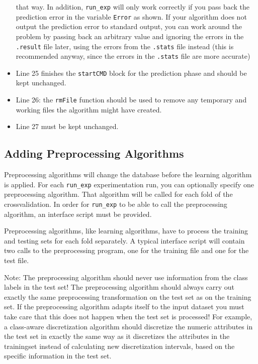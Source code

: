 \documentclass[a4paper,10pt,twoside]{article}
\begin{document}
\begin{itemize}
that way. In addition, \texttt{run\_exp} will only work correctly
if you pass back the prediction error in the variable \texttt{Error}
as shown. If your algorithm does not output the prediction error 
to standard output, you can work around the problem by passing
back an arbitrary value and ignoring the errors in the \texttt{.result}
file later, using the errors from the \texttt{.stats} file instead
(this is recommended anyway, since the errors in the \texttt{.stats}
file are more accurate)
\item Line 25 finishes the \texttt{startCMD} block for the prediction
phase and should be kept unchanged.
\item Line 26: the \texttt{rmFile} function should be used to 
remove any temporary and working files the algorithm might have created.
\item Line 27 must be kept unchanged.
\end{itemize}




\subsection{Adding Preprocessing Algorithms}

Preprocessing algorithms will change the database before the learning 
algorithm is applied. For each \verb=run_exp=  experimentation run,
you can optionally specify one preprocessing algorithm. That algorithm 
will be called for each fold of the crossvalidation.
In order for \verb=run_exp= to be able to call the preprocessing
algorithm, an interface script must be provided.

Preprocessing algorithms, like learning algorithms, have to 
process the training and testing sets for each fold separately. 
A typical interface script will contain two calls to the preprocessing
program, one for the training file  and one for the test file.

Note: The preprocessing algorithm should never use information from
the class labels in the test set! The preprocessing algorithm should
always carry out exactly the same preprocessing transformation on the
test set as on the training set. If the preprocessing algorithm
adapts itself to the input dataset you must take care that this
does not happen when the test set is processed!
For example, a class-aware 
discretization algorithm should discretize the numeric attributes
in the test set in exactly the same way as it discretizes the 
attributes in the trainingset instead of calculating new 
discretization intervals, based on the specific information in the test
set.
\end{document}
